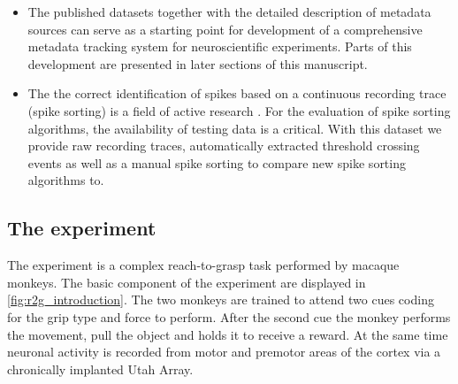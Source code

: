 \begin{itemize}
 \item The published datasets together with the detailed description of metadata sources can serve as a starting point for development of a comprehensive metadata tracking system for neuroscientific experiments. Parts of this development are presented in later sections of this manuscript.
 \item The the correct identification of spikes based on a continuous recording trace (spike sorting) is a field of active research \citep{Rey_2015, Lefebvre_2016, Sukiban_2019}. For the evaluation of spike sorting algorithms, the availability of testing data is a critical. With this dataset we provide raw recording traces, automatically extracted threshold crossing events as well as a manual spike sorting to compare new spike sorting algorithms to.
\end{itemize}






\subsection{The experiment}

The experiment is a complex reach-to-grasp task performed by macaque monkeys. The basic component of the experiment are displayed in \cref{fig:r2g_introduction}. The two monkeys are trained to attend two cues coding for the grip type and force to perform. After the second cue the monkey performs the movement, pull the object and holds it to receive a reward. At the same time neuronal activity is recorded from motor and premotor areas of the cortex via a chronically implanted Utah Array. 

